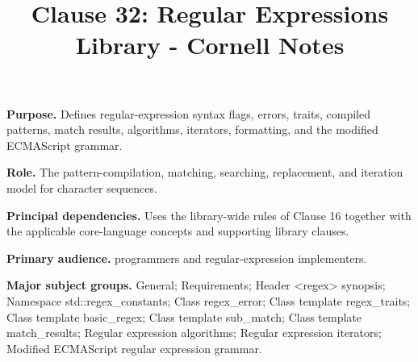 \documentclass[11pt,letterpaper]{article}
\title{Clause 32: Regular Expressions Library - Cornell Notes}
\author{}
\date{}
\begin{document}
\maketitle
\begin{CornellReferenceOrientationBox}
\textbf{Purpose.} Defines regular-expression syntax flags, errors, traits, compiled patterns, match results, algorithms, iterators, formatting, and the modified ECMAScript grammar.
\par\textbf{Role.} The pattern-compilation, matching, searching, replacement, and iteration model for character sequences.
\par\textbf{Principal dependencies.} Uses the library-wide rules of Clause 16 together with the applicable core-language concepts and supporting library clauses.
\par\textbf{Primary audience.} programmers and regular-expression implementers.
\par\textbf{Major subject groups.} General; Requirements; Header <regex> synopsis; Namespace std::regex\_\allowbreak{}constants; Class regex\_\allowbreak{}error; Class template regex\_\allowbreak{}traits; Class template basic\_\allowbreak{}regex; Class template sub\_\allowbreak{}match; Class template match\_\allowbreak{}results; Regular expression algorithms; Regular expression iterators; Modified ECMAScript regular expression grammar.
\end{CornellReferenceOrientationBox}
\end{document}
